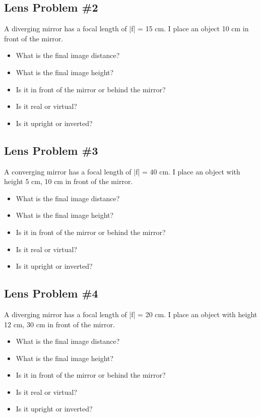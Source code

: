 \documentclass[11pt]{article}
\begin{document}
\subsection{Lens Problem \#2}
A diverging mirror has a focal length of |f| = 15 cm.  I place an object 10 cm in front of the mirror.  

\begin{itemize}
\item What is the final image distance?
\item What is the final image height?
\item Is it in front of the mirror or behind the mirror?  
\item Is it real or virtual?
\item Is it upright or inverted?
\end{itemize}

\subsection{Lens Problem \#3}
A converging mirror has a focal length of |f| = 40 cm.  I place an object with height 5 cm, 10 cm in front of the mirror.  

\begin{itemize}
\item What is the final image distance?
\item What is the final image height?
\item Is it in front of the mirror or behind the mirror?  
\item Is it real or virtual?
\item Is it upright or inverted?
\end{itemize}

\subsection{Lens Problem \#4}
A diverging mirror has a focal length of |f| = 20 cm.  I place an object with height 12 cm, 30 cm in front of the mirror.  

\begin{itemize}
\item What is the final image distance?
\item What is the final image height?
\item Is it in front of the mirror or behind the mirror?  
\item Is it real or virtual?
\item Is it upright or inverted?
\end{itemize}
\end{document}
